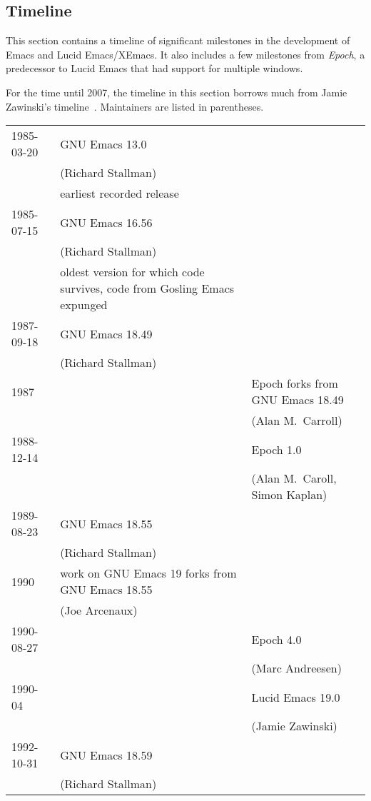 \documentclass[format=acmsmall, review]{acmart}
\begin{document}

\subsection{Timeline}

This section contains a timeline of significant milestones in the
development of Emacs and Lucid Emacs/XEmacs.  It also includes a few
milestones from \textit{Epoch}, a predecessor to Lucid Emacs that
had support for multiple windows.

For the time until 2007, the timeline in this section borrows much
from Jamie Zawinski's timeline~\cite{JWZTimeline}.  Maintainers are
listed in parentheses.

\begin{center}
  \begin{longtabu} to \textwidth {l|X|X}
    1985-03-20 & GNU Emacs 13.0 \\
    & (Richard Stallman)\\
    & earliest recorded release\\[1ex]
    1985-07-15 & GNU Emacs 16.56 \\
    & (Richard Stallman)\\
    & oldest version for which code survives, code from Gosling Emacs expunged\\[1ex]
    1987-09-18 & GNU Emacs 18.49\\
    & (Richard Stallman)\\[1ex]
    1987 & & Epoch forks from GNU Emacs 18.49\\
    && (Alan M.\ Carroll)\\[1ex]
    1988-12-14 & & Epoch 1.0\\
    & & (Alan M.\ Caroll, Simon Kaplan)\\[1ex]
    1989-08-23 & GNU Emacs 18.55\\
    & (Richard Stallman)\\[1ex]
    1990 & work on GNU Emacs 19 forks from GNU Emacs 18.55\\
    & (Joe Arcenaux)\\[1ex]
    1990-08-27 & & Epoch 4.0\\
    && (Marc Andreesen)\\[1ex]
    1990-04 && Lucid Emacs 19.0 \\
    && (Jamie Zawinski)\\[1ex]
    1992-10-31 & GNU Emacs 18.59 \\
    & (Richard Stallman)\\

\end{longtabu}
\end{center}
\end{document}
